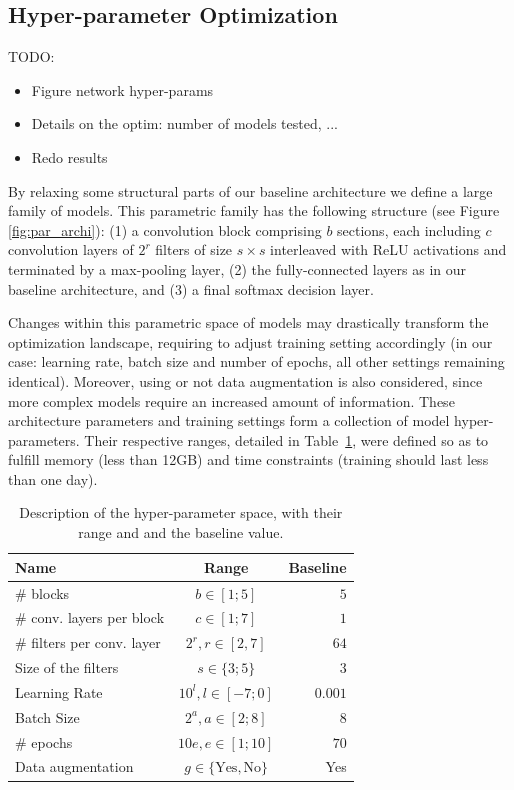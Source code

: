 \subsection{Hyper-parameter Optimization}

TODO:
\begin{itemize}
    \item Figure network hyper-params
    \item Details on the optim: number of models tested, ...
    \item Redo results
\end{itemize}

By relaxing some structural parts of our baseline architecture we define a large family of models. This parametric family has the following structure (see Figure \ref{fig:par_archi}): (1) a convolution block comprising $b$ sections, each including $c$ convolution layers of $2^r$ filters of size $s \times s$ interleaved with ReLU activations and terminated by a max-pooling layer, (2) the fully-connected layers as in our baseline architecture, and (3) a final softmax decision layer. 

Changes within this parametric space of models may drastically transform the optimization landscape, requiring to adjust training setting accordingly (in our case: learning rate, batch size and number of epochs, all other settings remaining identical). Moreover, using or not data augmentation is also considered, since more complex models require an increased amount of information.
These architecture parameters and training settings form a collection of model hyper-parameters. Their respective ranges, detailed in Table~\ref{table:hyper}, were defined so as to fulfill memory (less than 12GB) and time constraints (training should last less than one day).

\begin{table}
	\centering
	\begin{tabular}{ | l | c | r | }
		\hline
		Name & Range & Baseline \\ \hline
		\# blocks & $b \in [1 ; 5]$ & $5$ \\
		\# conv. layers per block & $c \in [1 ; 7]$ & $1$ \\
		\# filters per conv. layer & $2^{r}, r \in [2, 7]$ & $64$ \\
		Size of the filters & $ s \in \{3 ; 5\}$ & $3$ \\
		Learning Rate & $10^{l}, l \in [-7 ; 0]$ & $0.001$ \\
		Batch Size & $2^{a}, a \in [2 ; 8]$ & 8 \\
		\# epochs & $10e, e \in [1 ; 10]$ & $70$ \\
        Data augmentation & $g \in \{\text{Yes}, \text{No}\}$ & Yes \\
		\hline
	\end{tabular}
	\caption{Description of the hyper-parameter space, with their range and and the baseline value.}
	\label{table:hyper}
\end{table}

